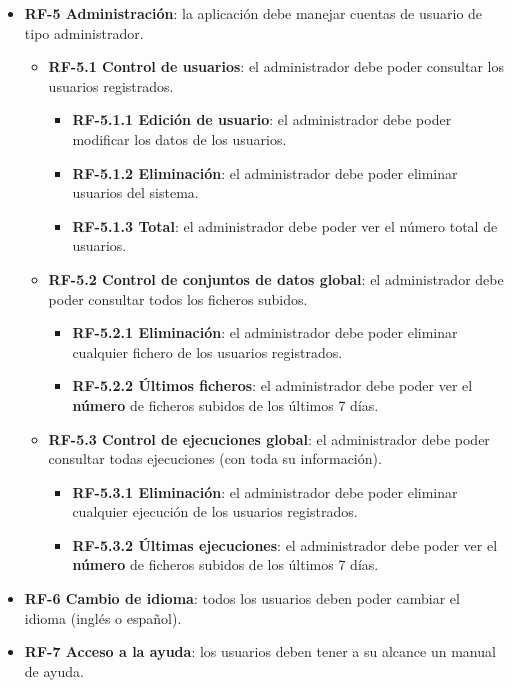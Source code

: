 \begin{itemize}
    \item \textbf{RF-5 Administración}: la aplicación debe manejar cuentas de
    usuario de tipo administrador.
    \begin{itemize}
        \item \textbf{RF-5.1 Control de usuarios}: el administrador debe poder
        consultar los usuarios registrados.
        \begin{itemize}
            \item \textbf{RF-5.1.1 Edición de usuario}: el administrador debe
            poder modificar los datos de los usuarios.
            \item \textbf{RF-5.1.2 Eliminación}: el administrador debe poder
            eliminar usuarios del sistema.
            \item \textbf{RF-5.1.3 Total}: el administrador debe poder ver el
            número total de usuarios.
        \end{itemize}
        \item \textbf{RF-5.2 Control de conjuntos de datos global}: el
        administrador debe poder consultar todos los ficheros subidos.
        \begin{itemize}          
            \item \textbf{RF-5.2.1 Eliminación}: el administrador debe poder
            eliminar cualquier fichero de los usuarios registrados.
            \item \textbf{RF-5.2.2 Últimos ficheros}: el administrador debe
            poder ver el \textbf{número} de ficheros subidos de los últimos 7
            días.
        \end{itemize}
        \item \textbf{RF-5.3 Control de ejecuciones global}: el administrador
        debe poder consultar todas ejecuciones (con toda su información).
        \begin{itemize}          
            \item \textbf{RF-5.3.1 Eliminación}: el administrador debe poder
            eliminar cualquier ejecución de los usuarios registrados.
            \item \textbf{RF-5.3.2 Últimas ejecuciones}: el administrador debe
            poder ver el \textbf{número} de ficheros subidos de los últimos 7
            días.
        \end{itemize}
    \end{itemize}

    \item \textbf{RF-6 Cambio de idioma}: todos los usuarios deben poder cambiar
    el idioma (inglés o español).

	\item \textbf{RF-7 Acceso a la ayuda}: los usuarios deben tener a su
	alcance un manual de ayuda.

\end{itemize}

